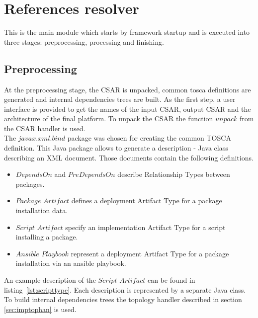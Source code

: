 \section{References resolver}
This is the main module which starts by framework startup and is executed into three stages: preprocessing, processing and finishing.

\subsection*{Preprocessing}
At the preprocessing stage, the CSAR is unpacked, common \gls{tosca} definitions are generated and internal dependencies trees are built. 
%
As the first step, a user interface is provided to get the names of the input CSAR, output CSAR and the architecture of the final platform.
To unpack the CSAR the function $unpack$ from the CSAR handler is used.\\
%
The $javax$.$xml$.$bind$ package was chosen for creating the common TOSCA definition. 
This Java package allows to generate a description - Java class describing an XML document. 
Those documents contain the following definitions.
\begin{itemize}
	\item $DependsOn$ and $PreDependsOn$ describe Relationship Types %
	  between packages.%
	\item $Package$ $Artifact$ defines a deployment Artifact Type for a package installation data.
	\item $Script$ $Artifact$ specify an implementation Artifact Type for a script installing a package.
	\item $Ansible$ $Playbook$ represent a deployment Artifact Type for a package installation via an ansible playbook.
\end{itemize}
An example description of the $Script$ $Artifact$ can be found in listing~\ref{lst:scripttype}.
Each description is represented by a separate Java class.\\
%
To build internal dependencies trees the topology handler described in section \ref{sec:imptophan} is used. 

